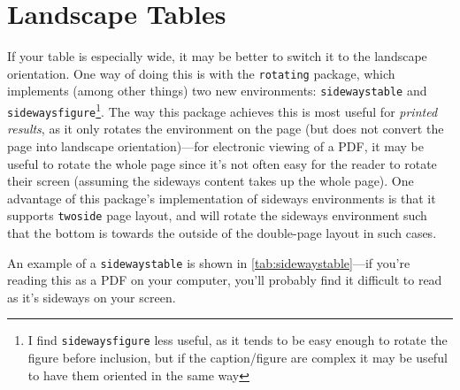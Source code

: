 \section{Landscape Tables}\label{sec:landscapetables}

If your table is especially wide, it may be better to switch it to the landscape orientation. One way of doing this is with the \texttt{rotating} package, which implements (among other things) two new environments: \texttt{sidewaystable} and \texttt{sidewaysfigure}\footnote{I find \texttt{sidewaysfigure} less useful, as it tends to be easy enough to rotate the figure before inclusion, but if the caption/figure are complex it may be useful to have them oriented in the same way}. The way this package achieves this is most useful for \emph{printed results}, as it only rotates the environment on the page (but does not convert the page into landscape orientation)---for electronic viewing of a PDF, it may be useful to rotate the whole page since it's not often easy for the reader to rotate their screen (assuming the sideways content takes up the whole page). One advantage of this package's implementation of sideways environments is that it supports \texttt{twoside} page layout, and will rotate the sideways environment such that the bottom is towards the outside of the double-page layout in such cases.

An example of a \texttt{sidewaystable} is shown in \autoref{tab:sidewaystable}---if you're reading this as a PDF on your computer, you'll probably find it difficult to read as it's sideways on your
screen.

